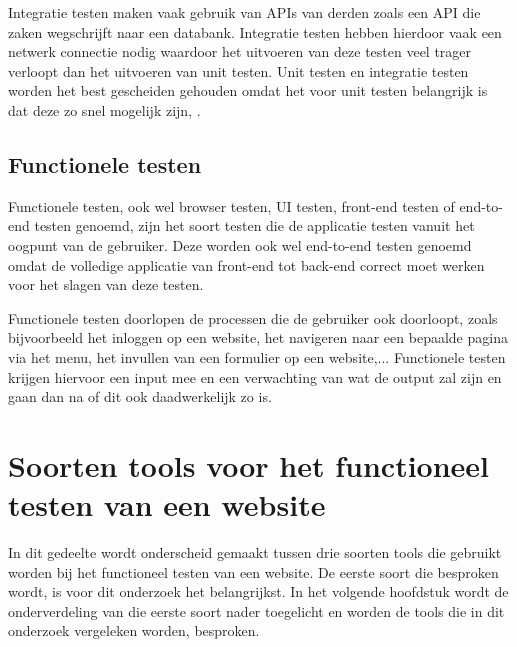 Integratie testen maken vaak gebruik van \glspl{API} van derden zoals een \gls{API} die zaken wegschrijft naar een databank. Integratie testen hebben hierdoor vaak een netwerk connectie nodig waardoor het uitvoeren van deze testen veel trager verloopt dan het uitvoeren van unit testen. Unit testen en integratie testen worden het best gescheiden gehouden omdat het voor unit testen belangrijk is dat deze zo snel mogelijk zijn, \textcite{Elliott2016}.

\subsection{Functionele testen}

Functionele testen, ook wel browser testen, \gls{UI} testen, front-end testen of end-to-end testen genoemd, zijn het soort testen die de applicatie testen vanuit het oogpunt van de gebruiker. Deze worden ook wel end-to-end testen genoemd omdat de volledige applicatie van front-end tot back-end correct moet werken voor het slagen van deze testen.

Functionele testen doorlopen de processen die de gebruiker ook doorloopt, zoals bijvoorbeeld het inloggen op een website, het navigeren naar een bepaalde pagina via het menu, het invullen van een formulier op een website,... Functionele testen krijgen hiervoor een input mee en een verwachting van wat de output zal zijn en gaan dan na of dit ook daadwerkelijk zo is.

\clearpage
\section{Soorten tools voor het functioneel testen van een website}

In dit gedeelte wordt onderscheid gemaakt tussen drie soorten \glspl{tool} die gebruikt worden bij het functioneel testen van een website. De eerste soort die besproken wordt, is voor dit onderzoek het belangrijkst. In het volgende hoofdstuk wordt de onderverdeling van die eerste soort nader toegelicht en worden de \glspl{tool} die in dit onderzoek vergeleken worden, besproken.

